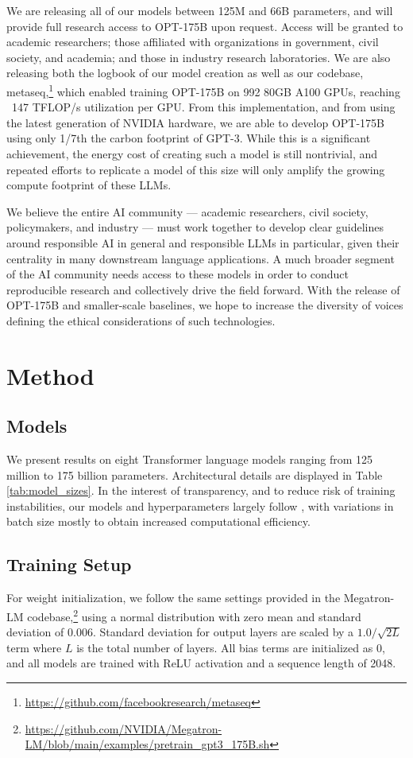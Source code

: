 We are releasing all of our models between 125M and 66B parameters, and will provide full research access to OPT-175B upon request. Access will be granted to academic researchers; those affiliated with organizations in government, civil society, and academia; and those in industry research laboratories. We are also releasing both the logbook of our model creation as well as our codebase, {metaseq},\footnote{\url{https://github.com/facebookresearch/metaseq}} which enabled training {OPT-175B} on 992 80GB A100 GPUs, reaching ~147 TFLOP/s utilization per GPU.  From this implementation, and from using the latest generation of NVIDIA hardware, we are able to develop {OPT-175B} using only 1/7th the carbon footprint of {GPT-3.}  While this is a significant achievement, the energy cost of creating such a model is still nontrivial, and repeated efforts to replicate a model of this size will only amplify the growing compute footprint of these LLMs.

We believe the entire AI community — academic researchers, civil society, policymakers, and industry — must work together to develop clear guidelines around responsible AI in general and responsible LLMs in particular, given their centrality in many downstream language applications. A much broader segment of the AI community needs access to these models in order to conduct reproducible research and collectively drive the field forward. With the release of OPT-175B and smaller-scale baselines, we hope to increase the diversity of voices defining the ethical considerations of such technologies.

\section{Method}
\label{sec:method}

\subsection{Models}
\label{sec:models}

We present results on eight Transformer language models ranging from 125 million to 175 billion parameters. Architectural details are displayed in Table \ref{tab:model_sizes}. In the interest of transparency, and to reduce risk of training instabilities, our models and hyperparameters largely follow \citet{brown2020gpt3}, with variations in batch size mostly to obtain increased computational efficiency.

\subsection{Training Setup}
\label{sec:training_setup}
For weight initialization, we follow the same settings provided in the Megatron-LM codebase,\footnote{\url{https://github.com/NVIDIA/Megatron-LM/blob/main/examples/pretrain_gpt3_175B.sh}} using a normal distribution with zero mean and standard deviation of 0.006.  Standard deviation for output layers are scaled by a $1.0/\sqrt{2 L}$ term where $L$ is the total number of layers. All bias terms are initialized as 0, and all models are trained with ReLU activation and a sequence length of 2048.

